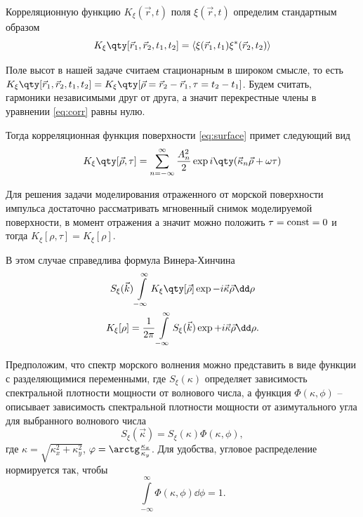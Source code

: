 Корреляционную функцию $K_{\xi}(\vec r,t)$ поля  $\xi(\vec r, t) $ определим
стандартным образом \cite{tihonov}
 \begin{equation}
    \label{eq:corr}
    K_{\xi}\qty[\vec r_1, \vec r_2, t_1,t_2] = \mean{\xi(\vec r_1,t_1)\xi^*(\vec r_2,t_2)}
\end{equation}

Поле высот в нашей задаче считаем стационарным в широком смысле, то есть 
$K_{\xi}\qty[\vec r_{1},\vec r_{2},t_{1},t_{2}] = K_{\xi}\qty[\vec \rho = \vec
r_{2} - \vec r_1, \tau=t_{2}-t_{1}]$. Будем считать, гармоники
независимыми друг от друга, а значит перекрестные члены в уравнении
\eqref{eq:corr} равны нулю.

Тогда корреляционная функция поверхности
\eqref{eq:surface} примет следующий вид
\begin{equation}
    \label{eq:surface_corr}
    K_{\xi}\qty[\vec \rho,\tau] = \sum\limits_{n=-\infty}^{\infty} 
    \frac{A_n^2}{2} 
    \exp{i \qty(\vec \kappa_n \vec \rho + \omega \tau)}
\end{equation}

Для решения задачи моделирования отраженного от морской поверхности импульса
достаточно рассматривать мгновенный снимок моделируемой поверхности, в момент
отражения
а значит можно положить $\tau = \text{\rmfamily\upshape const} = 0$  и  тогда $K_\xi[\rho,\tau] = K_\xi [\rho]$.

В этом случае справедлива формула Винера-Хинчина \cite{tihonov}
\begin{equation}
    \begin{gathered}
    \label{eq:Viner-Hinchin}
        S_\xi(\vec k) \int\limits_{-\infty}^{\infty} K_\xi \qty[\vec \rho] \exp{- i
        \vec \kappa \vec \rho} \dd \rho \\
        K_\xi[\rho] = \frac{1}{2 \pi} \int\limits_{-\infty}^{\infty} S_\xi (\vec k) \exp{+ i
        \vec \kappa \vec \rho} \dd \rho. 
    \end{gathered}
\end{equation}


Предположим, что спектр морского волнения можно представить в виде функции с
разделяющимися переменными, где $S_{\xi}(\kappa)$ определяет зависимость
спектральной плотности мощности от волнового числа, а функция $\Phi(\kappa, \phi)$ -- 
описывает зависимость спектральной плотности мощности от азимутального угла для
выбранного волнового числа
\begin{equation}
    S_\xi(\vec \kappa) = S_\xi(\kappa) \Phi(\kappa, \phi),
\end{equation}
где $\kappa = \sqrt{\kappa_x^2 + \kappa_y^2}$,  $\phi = \arctg
\frac{\kappa_x}{\kappa_y}$. Для
удобства, угловое распределение нормируется так, чтобы
\begin{equation}
\int\limits_{-\infty}^{\infty} \Phi(\kappa,\phi) \dd \phi = 1.
\end{equation}

